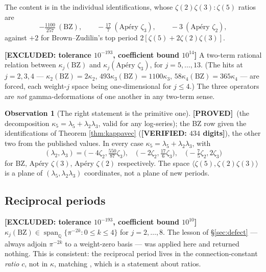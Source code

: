 \documentclass[11pt,reqno]{amsart}
\theoremstyle{plain}
\theoremstyle{definition}
\newtheorem{observation}[theorem]{Observation}
\theoremstyle{remark}
\newcommand{\PROVED}{{\normalfont\sffamily\bfseries[PROVED]}}
\newcommand{\VER}[1]{{\normalfont\sffamily\bfseries[VERIFIED: #1]}}
\newcommand{\EXCL}[1]{{\normalfont\sffamily\bfseries[EXCLUDED: #1]}}
\newcommand{\QQ}{\mathbb{Q}}
\DeclareMathOperator{\Span}{span}
\begin{document}
The content is in the individual identifications, whose $\zeta(2)\zeta(3):\zeta(5)$ ratios are
\[
  -\tfrac{1100}{257}\ (\mathrm{BZ}),\qquad -\tfrac{17}{7}\ (\text{Ap\'ery }\zeta_3),\qquad
  -3\ (\text{Ap\'ery }\zeta_2),
\]
against $+2$ for Brown--Zudilin's top period $2[\zeta(5)+2\zeta(2)\zeta(3)]$.

\EXCL{tolerance $10^{-193}$, coefficient bound $10^{14}$} A two-term rational relation
between $\kappa_j(\mathrm{BZ})$ and $\kappa_j(\text{Ap\'ery }\zeta_3)$, for $j=5,\dots,13$. (The
hits at $j=2,3,4$ --- $\kappa_2(\mathrm{BZ})=2\kappa_2$, $493\kappa_3(\mathrm{BZ})=1100\kappa_3$,
$58\kappa_4(\mathrm{BZ})=365\kappa_4$ --- are forced, each weight-$j$ space being one-dimensional
for $j\le4$.) The three operators are \emph{not} gamma-deformations of one another in any
two-term sense.

\begin{observation}[The right statement is the primitive one]\label{obs:primitive}
\PROVED\ (the decomposition $\kappa_5=\lambda_5+\lambda_2\lambda_3$, valid for any log-series);
the BZ row given the identifications of Theorem \ref{thm:kappavec} (\VER{$434$ digits}), the
other two from the published values.
In every case $\kappa_5=\lambda_5+\lambda_2\lambda_3$, with
\[
  (\lambda_2,\lambda_3)=\bigl(-4\zeta_2,\tfrac{550}{87}\zeta_3\bigr),\quad
  \bigl(-2\zeta_2,\tfrac{17}{6}\zeta_3\bigr),\quad
  \bigl(-\tfrac75\zeta_2,2\zeta_3\bigr)
\]
for BZ, Ap\'ery $\zeta(3)$, Ap\'ery $\zeta(2)$ respectively. The space
$\langle\zeta(5),\zeta(2)\zeta(3)\rangle$ is a plane of $(\lambda_5,\lambda_2\lambda_3)$
coordinates, not a plane of new periods.
\end{observation}

\subsection{Reciprocal periods}
\EXCL{tolerance $10^{-193}$, coefficient bound $10^{10}$}
$\kappa_j(\mathrm{BZ})\in\Span_\QQ\{\pi^{-2k}:0\le k\le4\}$ for $j=2,\dots,8$. The lesson of
\S\ref{sec:defect} --- always adjoin $\pi^{-2k}$ to a weight-zero basis --- was applied here and
returned nothing. This is consistent: the reciprocal period lives in the connection-constant
\emph{ratio} $c$, not in $\kappa$, matching \cite[Cor.~31]{BV}, which is a statement about
ratios.
\end{document}
